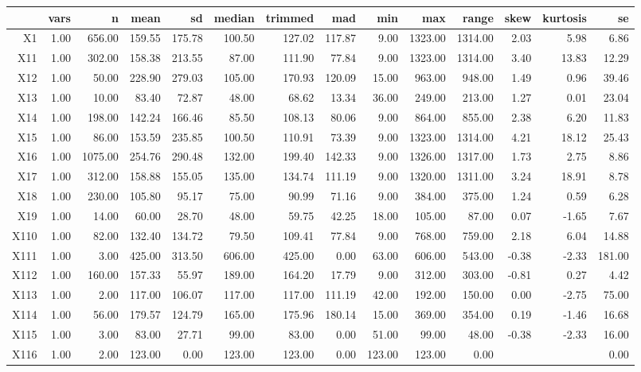 \begin{tabular}{rrrrrrrrrrrrrr}
  \hline
 & vars & n & mean & sd & median & trimmed & mad & min & max & range & skew & kurtosis & se \\ 
  \hline
X1 & 1.00 & 656.00 & 159.55 & 175.78 & 100.50 & 127.02 & 117.87 & 9.00 & 1323.00 & 1314.00 & 2.03 & 5.98 & 6.86 \\ 
  X11 & 1.00 & 302.00 & 158.38 & 213.55 & 87.00 & 111.90 & 77.84 & 9.00 & 1323.00 & 1314.00 & 3.40 & 13.83 & 12.29 \\ 
  X12 & 1.00 & 50.00 & 228.90 & 279.03 & 105.00 & 170.93 & 120.09 & 15.00 & 963.00 & 948.00 & 1.49 & 0.96 & 39.46 \\ 
  X13 & 1.00 & 10.00 & 83.40 & 72.87 & 48.00 & 68.62 & 13.34 & 36.00 & 249.00 & 213.00 & 1.27 & 0.01 & 23.04 \\ 
  X14 & 1.00 & 198.00 & 142.24 & 166.46 & 85.50 & 108.13 & 80.06 & 9.00 & 864.00 & 855.00 & 2.38 & 6.20 & 11.83 \\ 
  X15 & 1.00 & 86.00 & 153.59 & 235.85 & 100.50 & 110.91 & 73.39 & 9.00 & 1323.00 & 1314.00 & 4.21 & 18.12 & 25.43 \\ 
  X16 & 1.00 & 1075.00 & 254.76 & 290.48 & 132.00 & 199.40 & 142.33 & 9.00 & 1326.00 & 1317.00 & 1.73 & 2.75 & 8.86 \\ 
  X17 & 1.00 & 312.00 & 158.88 & 155.05 & 135.00 & 134.74 & 111.19 & 9.00 & 1320.00 & 1311.00 & 3.24 & 18.91 & 8.78 \\ 
  X18 & 1.00 & 230.00 & 105.80 & 95.17 & 75.00 & 90.99 & 71.16 & 9.00 & 384.00 & 375.00 & 1.24 & 0.59 & 6.28 \\ 
  X19 & 1.00 & 14.00 & 60.00 & 28.70 & 48.00 & 59.75 & 42.25 & 18.00 & 105.00 & 87.00 & 0.07 & -1.65 & 7.67 \\ 
  X110 & 1.00 & 82.00 & 132.40 & 134.72 & 79.50 & 109.41 & 77.84 & 9.00 & 768.00 & 759.00 & 2.18 & 6.04 & 14.88 \\ 
  X111 & 1.00 & 3.00 & 425.00 & 313.50 & 606.00 & 425.00 & 0.00 & 63.00 & 606.00 & 543.00 & -0.38 & -2.33 & 181.00 \\ 
  X112 & 1.00 & 160.00 & 157.33 & 55.97 & 189.00 & 164.20 & 17.79 & 9.00 & 312.00 & 303.00 & -0.81 & 0.27 & 4.42 \\ 
  X113 & 1.00 & 2.00 & 117.00 & 106.07 & 117.00 & 117.00 & 111.19 & 42.00 & 192.00 & 150.00 & 0.00 & -2.75 & 75.00 \\ 
  X114 & 1.00 & 56.00 & 179.57 & 124.79 & 165.00 & 175.96 & 180.14 & 15.00 & 369.00 & 354.00 & 0.19 & -1.46 & 16.68 \\ 
  X115 & 1.00 & 3.00 & 83.00 & 27.71 & 99.00 & 83.00 & 0.00 & 51.00 & 99.00 & 48.00 & -0.38 & -2.33 & 16.00 \\ 
  X116 & 1.00 & 2.00 & 123.00 & 0.00 & 123.00 & 123.00 & 0.00 & 123.00 & 123.00 & 0.00 &  &  & 0.00 \\ 
   \hline
\end{tabular}


